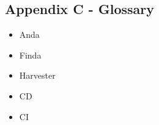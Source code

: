 \documentclass[main.tex]{subfiles}
\begin{document}
\subsection{Appendix C - Glossary}
\begin{itemize}
    \item Anda
    \item Finda
    \item Harvester
    \item CD
    \item CI
    
\end{itemize}
\end{document}
